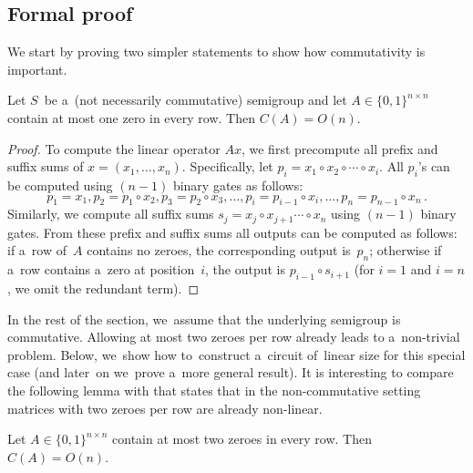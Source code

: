 \documentclass{toc}
\begin{document}
\subsection{Formal proof}
We start by proving two simpler statements to show how commutativity is
important.

\begin{lemma}\label{lemma:easy}
Let $S$~be a~(not necessarily commutative) semigroup and let
$A \in \{0,1\}^{n \times n}$ contain at most
one zero in every row. Then
$C(A) = O(n)$.
\end{lemma}

\begin{proof}
To compute the linear operator $Ax$, we first
precompute all prefix and suffix sums of $x=(x_1, \dotsc, x_n)$.
Specifically, let $p_i=x_1 \circ x_2 \circ \dotsb \circ x_i$. All $p_i$'s can be
computed using $(n-1)$ binary gates as follows:
\[
p_1=x_1, p_2=p_1 \circ x_2, p_3=p_2 \circ x_3, \dotsc, p_i=p_{i-1} \circ x_i, \dotsc, p_n=p_{n-1}\circ x_n\,.
\]
Similarly, we compute all suffix sums
$s_j=x_j \circ x_{j+1} \dotsb \circ x_n$ using
$(n-1)$ binary gates. From these prefix and suffix sums
all outputs can be
computed as follows: if a~row of~$A$ contains no zeroes,
the corresponding
output is~$p_n$; otherwise if a~row contains a~zero at position~$i$, the
output is $p_{i-1} \circ s_{i+1}$ (for $i=1$ and $i=n$, we omit the redundant
term).
\end{proof}

In the rest of the section, we~assume that the
underlying semigroup is
commutative. Allowing at most two zeroes per row already leads to a~non-trivial
problem.
Below, we~show how to~construct a~circuit of~linear size for
this special case (and later~on we~prove a~more general result).
It is interesting to compare the following lemma
with  that states that in the
non-commutative setting matrices with two zeroes per row are already
non-linear.

\begin{lemma} \label{lem:at_most_2}
Let $A \in \{0,1\}^{n \times n}$ contain at most two zeroes in every row. Then
$C(A) = O(n)$.
\end{lemma}
\end{document}
